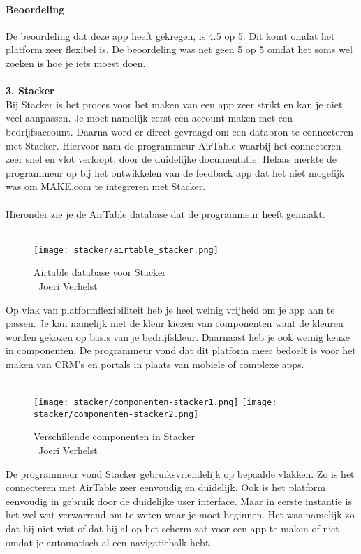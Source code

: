 \paragraph*{Beoordeling}
De beoordeling dat deze app heeft gekregen, is 4.5 op 5. Dit komt omdat het platform zeer flexibel is. 
De beoordeling was net geen 5 op 5 omdat het soms wel zoeken is hoe je iets moest doen.
\\
\\
\textbf{3. Stacker}
\\
Bij Stacker is het proces voor het maken van een app zeer strikt en kan je niet veel aanpassen. Je moet namelijk eerst een account maken met een bedrijfsaccount.
Daarna word er direct gevraagd om een databron te connecteren met Stacker. Hiervoor nam de programmeur AirTable waarbij het connecteren zeer snel en vlot verloopt, door de duidelijke documentatie.
Helaas merkte de programmeur op bij het ontwikkelen van de feedback app dat het niet mogelijk was om MAKE.com te integreren met Stacker.
\\
\\
Hieronder zie je de AirTable database dat de programmeur heeft gemaakt.
\\
\\
\begin{figure}[H]
    \texttt{[image: stacker/airtable\_stacker.png]}
    \caption[Airtable database voor Stacker]{Airtable database voor Stacker\\\textcopyright\ Joeri Verhelst}
    \label{fig:airtable-stacker}
\end{figure}
Op vlak van platformflexibiliteit heb je heel weinig vrijheid om je app aan te passen. Je kan namelijk niet de kleur kiezen van componenten want de kleuren worden gekozen
op basis van je bedrijfskleur. Daarnaast heb je ook weinig keuze in componenten. De programmeur vond dat dit platform meer bedoelt is voor het maken van CRM's en portals in plaats van 
mobiele of complexe apps.
\\
\\

\begin{figure}[H]
    \texttt{[image: stacker/componenten-stacker1.png]}
    \texttt{[image: stacker/componenten-stacker2.png]}
    \caption[Verschillende componenten in Stacker]{Verschillende componenten in Stacker\\\textcopyright\ Joeri Verhelst}
    \label{fig:componenten-stacker}
\end{figure}
De programmeur vond Stacker gebruiksvriendelijk op bepaalde vlakken. Zo is het connecteren met AirTable zeer eenvoudig en duidelijk.
Ook is het platform eenvoudig in gebruik door de duidelijke user interface. Maar in eerste instantie is het wel wat verwarrend om te weten waar je moet beginnen.
Het was namelijk zo dat hij niet wist of dat hij al op het scherm zat voor een app te maken of niet omdat je automatisch al een navigatiebalk hebt.
\\
\\
